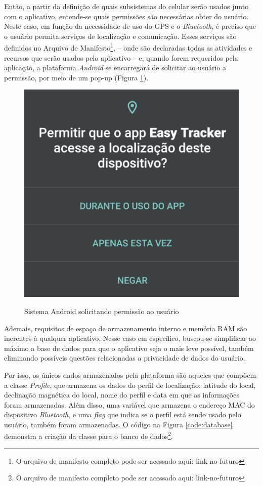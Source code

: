 Então, a partir da definição de quais subsistemas do celular serão usados junto com o aplicativo, entende-se quais permissões são necessárias obter do usuário. Neste caso, em função da necessidade de uso do GPS e o \textit{Bluetooth}, é preciso que o usuário permita serviços de localização e comunicação. Esses serviços são definidos no Arquivo de Manifesto\footnote{O arquivo de manifesto completo pode ser acessado aqui: link-no-futuro}, -- onde são declaradas todas as atividades e recursos que serão usados pelo aplicativo -- e, quando forem requeridos pela aplicação, a plataforma \textit{Android} se encarregará de solicitar ao usuário a permissão, por meio de um pop-up (Figura \ref{fig:permissaoandroid}).

\begin{figure}[htb]
	\centering
	\caption{Sistema Android solicitando permissão ao usuário}
	\includegraphics[width=0.35\linewidth]{figuras/desAplicativo/permission}
	\label{fig:permissaoandroid}
\end{figure}

Ademais, requisitos de espaço de armazenamento interno e memória RAM são inerentes à qualquer aplicativo. Nesse caso em específico, buscou-se simplificar ao máximo a base de dados para que o aplicativo seja o mais leve possível, também eliminando possíveis questões relacionadas a privacidade de dados do usuário.

Por isso, os únicos dados armazenados pela plataforma são aqueles que compõem a classe \textit{Profile}, que armazena os dados do perfil de localização: latitude do local, declinação magnética do local, nome do perfil e data em que as informações foram armazenadas. Além disso, uma variável que armazena o endereço MAC do dispositivo \textit{Bluetooth}, e uma \textit{flag} que indica se o perfil está sendo usado pelo usuário, também foram armazenadas. O código na Figura \ref{code:database} demonstra a criação da classe para o banco de dados\footnote{O arquivo de manifesto completo pode ser acessado aqui: link-no-futuro}.

